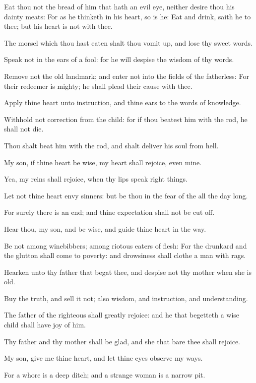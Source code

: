 \Verse Eat thou not the bread of him that hath an evil eye, neither desire thou his dainty meats: \Verse For as he thinketh in his heart, so is he: Eat and drink, saith he to thee; but his heart is not with thee.

\Verse The morsel which thou hast eaten shalt thou vomit up, and lose thy sweet words.

\Verse Speak not in the ears of a fool: for he will despise the wisdom of thy words.

\Verse Remove not the old landmark; and enter not into the fields of the fatherless: \Verse For their redeemer is mighty; he shall plead their cause with thee.

\Verse Apply thine heart unto instruction, and thine ears to the words of knowledge.

\Verse Withhold not correction from the child: for if thou beatest him with the rod, he shall not die.

\Verse Thou shalt beat him with the rod, and shalt deliver his soul from hell.

\Verse My son, if thine heart be wise, my heart shall rejoice, even mine.

\Verse Yea, my reins shall rejoice, when thy lips speak right things.

\Verse Let not thine heart envy sinners: but be thou in the fear of the \LORD all the day long.

\Verse For surely there is an end; and thine expectation shall not be cut off.

\Verse Hear thou, my son, and be wise, and guide thine heart in the way.

\Verse Be not among winebibbers; among riotous eaters of flesh: \Verse For the drunkard and the glutton shall come to poverty: and drowsiness shall clothe a man with rags.

\Verse Hearken unto thy father that begat thee, and despise not thy mother when she is old.

\Verse Buy the truth, and sell it not; also wisdom, and instruction, and understanding.

\Verse The father of the righteous shall greatly rejoice: and he that begetteth a wise child shall have joy of him.

\Verse Thy father and thy mother shall be glad, and she that bare thee shall rejoice.

\Verse My son, give me thine heart, and let thine eyes observe my ways.

\Verse For a whore is a deep ditch; and a strange woman is a narrow pit.

